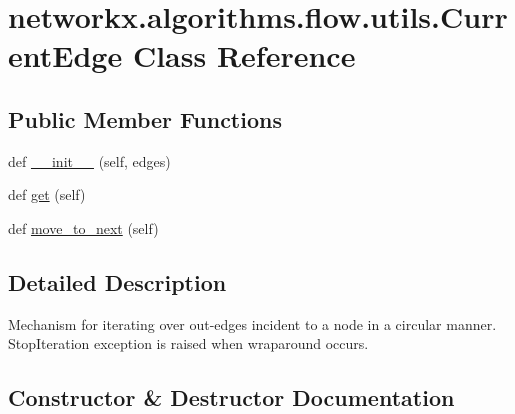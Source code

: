 \hypertarget{classnetworkx_1_1algorithms_1_1flow_1_1utils_1_1CurrentEdge}{}\section{networkx.\+algorithms.\+flow.\+utils.\+Current\+Edge Class Reference}
\label{classnetworkx_1_1algorithms_1_1flow_1_1utils_1_1CurrentEdge}
\subsection*{Public Member Functions}
\begin{DoxyCompactItemize}
\item 
def \hyperlink{classnetworkx_1_1algorithms_1_1flow_1_1utils_1_1CurrentEdge_aad20414ad850a849c2040c4f2eb39f1d}{\+\_\+\+\_\+init\+\_\+\+\_\+} (self, edges)
\item 
def \hyperlink{classnetworkx_1_1algorithms_1_1flow_1_1utils_1_1CurrentEdge_a21862bce8bcaa9aa5bcb464c477027e1}{get} (self)
\item 
def \hyperlink{classnetworkx_1_1algorithms_1_1flow_1_1utils_1_1CurrentEdge_af990dbef1c9e9d9ee97264619b41ff49}{move\+\_\+to\+\_\+next} (self)
\end{DoxyCompactItemize}


\subsection{Detailed Description}
\begin{DoxyVerb}Mechanism for iterating over out-edges incident to a node in a circular
manner. StopIteration exception is raised when wraparound occurs.
\end{DoxyVerb}
 

\subsection{Constructor \& Destructor Documentation}
\mbox{\label{classnetworkx_1_1algorithms_1_1flow_1_1utils_1_1CurrentEdge_aad20414ad850a849c2040c4f2eb39f1d}} 
